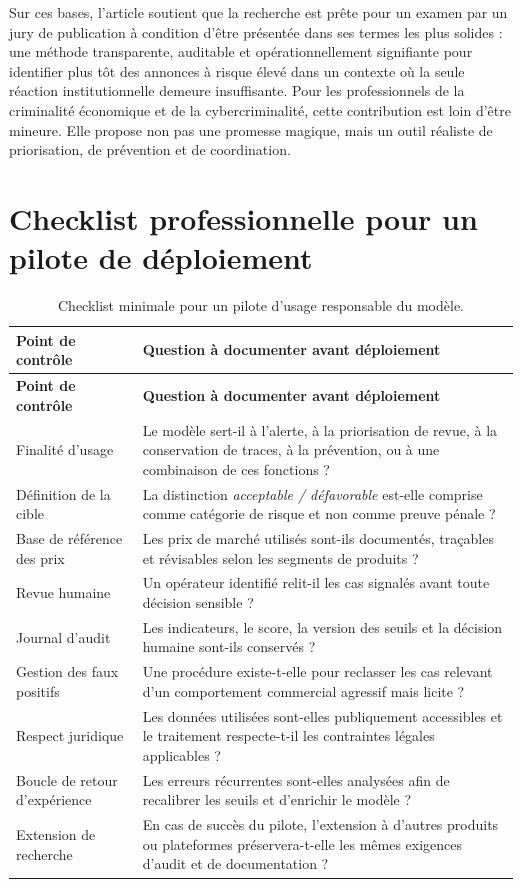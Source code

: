 \documentclass[10pt,a4paper]{article}
\begin{document}
Sur ces bases, l'article soutient que la recherche est prête pour un examen par un jury de publication à condition d'être présentée dans ses termes les plus solides : une méthode transparente, auditable et opérationnellement signifiante pour identifier plus tôt des annonces à risque élevé dans un contexte où la seule réaction institutionnelle demeure insuffisante. Pour les professionnels de la criminalité économique et de la cybercriminalité, cette contribution est loin d'être mineure. Elle propose non pas une promesse magique, mais un outil réaliste de priorisation, de prévention et de coordination.

\newpage

\section{Checklist professionnelle pour un pilote de déploiement}
\begin{longtable}{p{5.0cm} p{10.2cm}}
\caption{Checklist minimale pour un pilote d'usage responsable du modèle.}\\
\toprule
\textbf{Point de contrôle} & \textbf{Question à documenter avant déploiement} \\
\midrule
\endfirsthead
\toprule
\textbf{Point de contrôle} & \textbf{Question à documenter avant déploiement} \\
\midrule
\endhead
Finalité d'usage & Le modèle sert-il à l'alerte, à la priorisation de revue, à la conservation de traces, à la prévention, ou à une combinaison de ces fonctions ? \\
Définition de la cible & La distinction \emph{acceptable / défavorable} est-elle comprise comme catégorie de risque et non comme preuve pénale ? \\
Base de référence des prix & Les prix de marché utilisés sont-ils documentés, traçables et révisables selon les segments de produits ? \\
Revue humaine & Un opérateur identifié relit-il les cas signalés avant toute décision sensible ? \\
Journal d'audit & Les indicateurs, le score, la version des seuils et la décision humaine sont-ils conservés ? \\
Gestion des faux positifs & Une procédure existe-t-elle pour reclasser les cas relevant d'un comportement commercial agressif mais licite ? \\
Respect juridique & Les données utilisées sont-elles publiquement accessibles et le traitement respecte-t-il les contraintes légales applicables ? \\
Boucle de retour d'expérience & Les erreurs récurrentes sont-elles analysées afin de recalibrer les seuils et d'enrichir le modèle ? \\
Extension de recherche & En cas de succès du pilote, l'extension à d'autres produits ou plateformes préservera-t-elle les mêmes exigences d'audit et de documentation ? \\
\bottomrule
\end{longtable}
\end{document}
